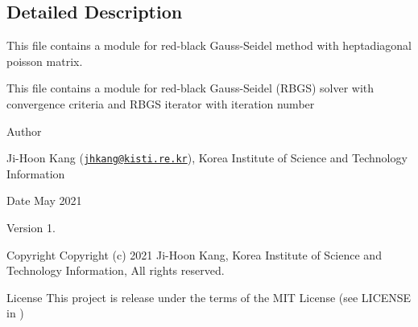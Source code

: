 \subsection{Detailed Description}
This file contains a module for red-\/black Gauss-\/\+Seidel method with heptadiagonal poisson matrix. 

This file contains a module for red-\/black Gauss-\/\+Seidel (R\+B\+GS) solver with convergence criteria and R\+B\+GS iterator with iteration number \begin{DoxyAuthor}{Author}

\begin{DoxyItemize}
\item Ji-\/\+Hoon Kang (\href{mailto:jhkang@kisti.re.kr}{\tt jhkang@kisti.\+re.\+kr}), Korea Institute of Science and Technology Information
\end{DoxyItemize}
\end{DoxyAuthor}
\begin{DoxyDate}{Date}
May 2021 
\end{DoxyDate}
\begin{DoxyVersion}{Version}
1. 
\end{DoxyVersion}
\begin{DoxyParagraph}{Copyright}
Copyright (c) 2021 Ji-\/\+Hoon Kang, Korea Institute of Science and Technology Information, All rights reserved. 
\end{DoxyParagraph}
\begin{DoxyParagraph}{License }
This project is release under the terms of the M\+IT License (see L\+I\+C\+E\+N\+SE in ) 
\end{DoxyParagraph}
